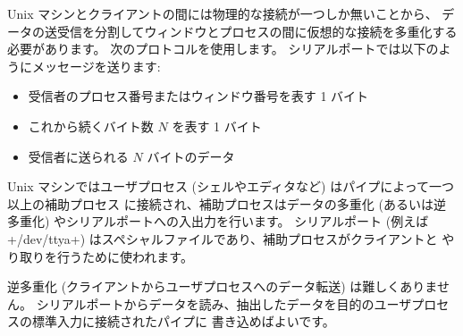 Unix マシンとクライアントの間には物理的な接続が一つしか無いことから、
データの送受信を分割してウィンドウとプロセスの間に仮想的な接続を多重化する必要があります。
次のプロトコルを使用します。
シリアルポートでは以下のようにメッセージを送ります:

%
\begin{itemize}
\item 受信者のプロセス番号またはウィンドウ番号を表す 1 バイト
\item これから続くバイト数 $N$ を表す 1 バイト
\item 受信者に送られる $N$ バイトのデータ
\end{itemize}
%
Unix マシンではユーザプロセス (シェルやエディタなど) はパイプによって一つ以上の補助プロセス
に接続され、補助プロセスはデータの多重化 (あるいは逆多重化) やシリアルポートへの入出力を行います。
シリアルポート (例えば \ml+/dev/ttya+) はスペシャルファイルであり、補助プロセスがクライアントと
やり取りを行うために使われます。

逆多重化 (クライアントからユーザプロセスへのデータ転送) は難しくありません。
シリアルポートからデータを読み、抽出したデータを目的のユーザプロセスの標準入力に接続されたパイプに
書き込めばよいです。
%

